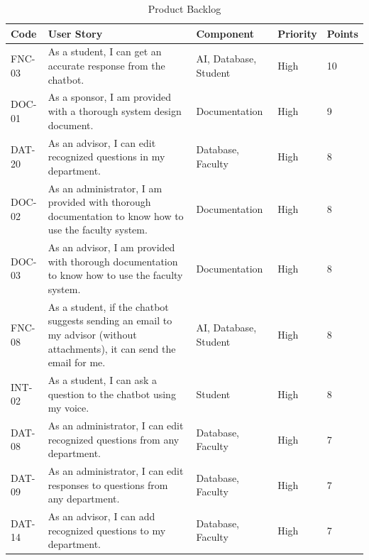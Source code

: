 \documentclass[titlepage, 12pt]{article}
\begin{document}
\begin{center}

        \begin{longtable}{ L{1.5cm} L{4cm} L{3cm} L{1.5cm} L{1.5cm} }
        \caption{Product Backlog} \\
        \toprule
        \textbf{Code} & \textbf{User Story} & \textbf{Component} & \textbf{Priority} & \textbf{Points} \\
        \toprule
        \endhead
        FNC-03 & As a student, I can get an accurate response from the chatbot.                                                                    & AI, Database, Student & High   & 10 \\
        \midrule
DOC-01 & As a sponsor, I am provided with a thorough system design document.                                                               & Documentation         & High   & 9  \\
\midrule
DAT-20 & As an advisor, I can edit recognized questions in my department.                                                                  & Database, Faculty     & High   & 8  \\
\midrule
DOC-02 & As an administrator, I am provided with thorough documentation to know how to use the faculty system.                             & Documentation         & High   & 8  \\
\midrule
DOC-03 & As an advisor, I am provided with thorough documentation to know how to use the faculty system.                                   & Documentation         & High   & 8  \\
\midrule
FNC-08 & As a student, if the chatbot suggests sending an email to my advisor (without attachments), it can send the email for me.         & AI, Database, Student & High   & 8  \\
\midrule
INT-02 & As a student, I can ask a question to the chatbot using my voice.                                                                 & Student               & High   & 8  \\
\midrule
DAT-08 & As an administrator, I can edit recognized questions from any department.                                                         & Database, Faculty     & High   & 7  \\
\midrule
DAT-09 & As an administrator, I can edit responses to questions from any department.                                                       & Database, Faculty     & High   & 7  \\
\midrule
DAT-14 & As an advisor, I can add recognized questions to my department.                                                                   & Database, Faculty     & High   & 7  \\

\end{longtable}
\end{center}
\end{document}
